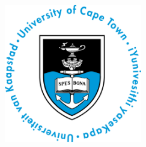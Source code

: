 \documentclass[
11pt,
oneside, 
english,
singlespacing,
headsepline, 
fleqn
]{MastersDoctoralThesis}
\author{Devon \textsc{Stone}} %
\begin{document}
\frontmatter %
\pagestyle{plain} %


\begin{titlepage}
\begin{center}

\vspace*{.06\textheight}
{\scshape\huge \univname\par}\vspace{1cm} %
\includegraphics[width=0.45\textwidth]{images/logo.png}\\[0.6cm] %
\HRule \\[0.4cm] %
{\huge \bfseries \ttitle\par}\vspace{0.4cm} %
\HRule \\[1cm] %
 

\end{center}
\end{titlepage}
\end{document}
